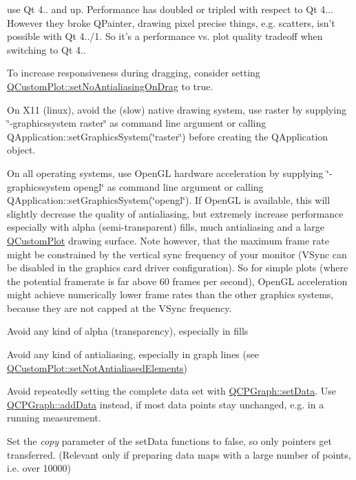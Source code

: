 \begin{DoxyItemize}
\item use Qt 4.. and up. Performance has doubled or tripled with respect to Qt 4... However they broke Q\-Painter, drawing pixel precise things, e.\-g. scatters, isn't possible with Qt 4../1. So it's a performance vs. plot quality tradeoff when switching to Qt 4.. \item To increase responsiveness during dragging, consider setting \hyperlink{classQCustomPlot_a775bdcb6329d44701aeaa6135b0e5265}{Q\-Custom\-Plot\-::set\-No\-Antialiasing\-On\-Drag} to true. \item On X11 (linux), avoid the (slow) native drawing system, use raster by supplying \char`\"{}-\/graphicssystem raster\char`\"{} as command line argument or calling Q\-Application\-::set\-Graphics\-System(\char`\"{}raster\char`\"{}) before creating the Q\-Application object. \item On all operating systems, use Open\-G\-L hardware acceleration by supplying \char`\"{}-\/graphicssystem
 opengl\char`\"{} as command line argument or calling Q\-Application\-::set\-Graphics\-System(\char`\"{}opengl\char`\"{}). If Open\-G\-L is available, this will slightly decrease the quality of antialiasing, but extremely increase performance especially with alpha (semi-\/transparent) fills, much antialiasing and a large \hyperlink{classQCustomPlot}{Q\-Custom\-Plot} drawing surface. Note however, that the maximum frame rate might be constrained by the vertical sync frequency of your monitor (V\-Sync can be disabled in the graphics card driver configuration). So for simple plots (where the potential framerate is far above 60 frames per second), Open\-G\-L acceleration might achieve numerically lower frame rates than the other graphics systems, because they are not capped at the V\-Sync frequency. \item Avoid any kind of alpha (transparency), especially in fills \item Avoid any kind of antialiasing, especially in graph lines (see \hyperlink{classQCustomPlot_ae10d685b5eabea2999fb8775ca173c24}{Q\-Custom\-Plot\-::set\-Not\-Antialiased\-Elements}) \item Avoid repeatedly setting the complete data set with \hyperlink{classQCPGraph_a1df2fd710545c8ba3b2c99a39a27bf8b}{Q\-C\-P\-Graph\-::set\-Data}. Use \hyperlink{classQCPGraph_aa5c6181d84db72ce4dbe9dc15a34ef4f}{Q\-C\-P\-Graph\-::add\-Data} instead, if most data points stay unchanged, e.\-g. in a running measurement. \item Set the {\itshape copy} parameter of the set\-Data functions to false, so only pointers get transferred. (Relevant only if preparing data maps with a large number of points, i.\-e. over 10000) \end{DoxyItemize}

